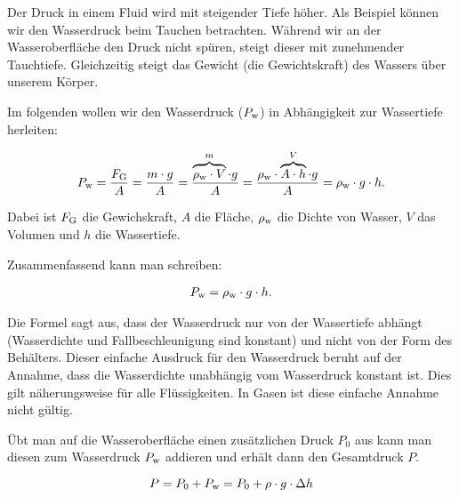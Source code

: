 \documentclass[12pt,a4paper,twoside]{article}
\begin{document}
Der Druck in einem Fluid wird mit steigender Tiefe höher. Als Beispiel können wir den Wasserdruck
beim Tauchen betrachten. Während wir an der Wasseroberfläche den Druck nicht spüren, steigt dieser
mit zunehmender Tauchtiefe. Gleichzeitig steigt das Gewicht (die Gewichtskraft) des Wassers über
unserem Körper.

Im folgenden wollen wir den Wasserdruck ($P_{\textrm w}$) in Abhängigkeit zur Wassertiefe herleiten:

\begin{equation*}
	P_{\textrm w} = \frac{F_{\textrm G}}{A}=\frac{m\cdot g}{A}=\frac{\overbrace{\rho_{\textrm w} \cdot V}^{m} \cdot g}{A}=\frac{\rho_{\textrm w} \cdot \overbrace{A \cdot h}^{V} \cdot g}{A}=\rho_{\textrm w}\cdot g\cdot h.
\end{equation*}

Dabei ist $F_{\textrm G}$ die Gewichskraft, $A$ die Fläche, $\rho_{\textrm w}$ die Dichte von Wasser, $V$ das Volumen und $h$
die Wassertiefe.

Zusammenfassend kann man schreiben:
\begin{cbox}
	\begin{eqnarray*}
	P_{\textrm w} = \rho_{\textrm w}\cdot g\cdot h.
	\end{eqnarray*}
\end{cbox}

Die Formel sagt aus, dass der Wasserdruck nur von der Wassertiefe abhängt (Wasserdichte und Fallbeschleunigung sind konstant)
und nicht von der Form des Behälters.
Dieser einfache Ausdruck für den Wasserdruck beruht auf der Annahme, dass die Wasserdichte unabhängig vom
Wasserdruck konstant ist. Dies gilt näherungsweise für alle Flüssigkeiten. In Gasen ist diese einfache
Annahme nicht gültig.

Übt man auf die Wasseroberfläche einen zusätzlichen Druck $P_0$ aus kann man diesen zum Wasserdruck $P_{\textrm w}$ addieren
und erhält dann den Gesamtdruck $P$.

\begin{cbox}
	\begin{equation*}
		P = P_0 + P_{\textrm w} = P_0 + \rho \cdot g \cdot \Delta h
	\end{equation*}
\end{cbox}

\end{document}
